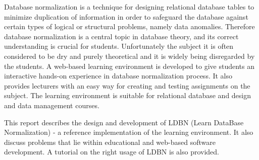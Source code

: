 Database normalization is a technique for designing relational database tables 
to minimize duplication of information in order to safeguard the database 
against certain types of logical or structural problems, namely data anomalies. 
Therefore database normalization is a central topic in database theory, and its 
correct understanding is crucial for students. Unfortunately  the subject it is 
often considered to be dry and purely theoretical and it is widely being disregarded 
by the students. A web-based learning environment is developed to give 
students an interactive hands-on experience in database normalization process. It
also provides lecturers with an easy way for creating and testing assignments 
on the subject.  
The learning environment is suitable for relational database and design and data 
management courses. 

This report describes the design and development of LDBN 
(Learn DataBase Normalization) - a reference implementation of the learning environment.
It also discuss problems that lie within educational and web-based software development.
A tutorial on the right usage of LDBN is also provided.   
